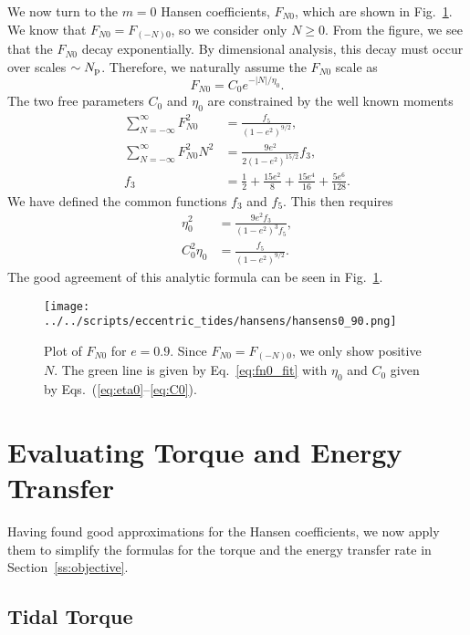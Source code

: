 \documentclass[
        fleqn,
        usenatbib,
    ]{mnras}
\newcommand*{\abs}[1]{\left|#1\right|}
\newcommand*{\p}[1]{\left(#1\right)}
\begin{document}
We now turn to the $m = 0$ Hansen coefficients, $F_{N0}$, which are shown in
Fig.~\ref{fig:fn0_fit}. We know that $F_{N0} = F_{(-N)0}$, so we consider only
$N \geq 0$. From the figure, we see that the $F_{N0}$ decay exponentially. By
dimensional analysis, this decay must occur over scales $\sim N_{\rm p}$.
Therefore, we naturally assume the $F_{N0}$ scale as
\begin{equation}
    F_{N0} = C_0 e^{-\abs{N} / \eta_0}.\label{eq:fn0_fit}
\end{equation}
The two free parameters $C_0$ and $\eta_0$ are constrained by the well known
moments \citep{hut81}
\begin{align}
    \sum\limits_{N = -\infty}^\infty F_{N0}^2 &= \frac{f_5}{\p{1 - e^2}^{9/2}}
        ,\\
    \sum\limits_{N = -\infty}^\infty F_{N0}^2 N^2
        &= \frac{9e^2}{2\p{1 - e^2}^{15/2}}
            f_3,\\
    f_3 &= \frac{1}{2} + \frac{15e^2}{8} + \frac{15 e^4}{16}
        + \frac{5e^6}{128}.
\end{align}
We have defined the common functions $f_3$ and $f_5$. This then requires
\begin{align}
    \eta_0^2 &= \frac{9e^2f_3}{\p{1 - e^2}^{3}f_5},\label{eq:eta0}\\
    C_0^2\eta_0 &= \frac{f_5}{\p{1 - e^2}^{9/2}}.\label{eq:C0}
\end{align}
The good agreement of this analytic formula can be seen in
Fig.~\ref{fig:fn0_fit}.

\begin{figure}
    \centering
    \texttt{[image: ../../scripts/eccentric\_tides/hansens/hansens0\_90.png]}
    \caption{Plot of $F_{N0}$ for $e = 0.9$. Since $F_{N0} = F_{(-N)0}$, we only
    show positive $N$. The green line is given by Eq.~\eqref{eq:fn0_fit} with
    $\eta_0$ and $C_0$ given by
    Eqs.~(\ref{eq:eta0}--\ref{eq:C0}).}\label{fig:fn0_fit}
\end{figure}

\section{Evaluating Torque and Energy Transfer}\label{s:eval}

Having found good approximations for the Hansen coefficients, we now apply them
to simplify the formulas for the torque and the energy transfer rate in
Section~\ref{ss:objective}.

\subsection{Tidal Torque}\label{ss:torque_eval}
\end{document}
